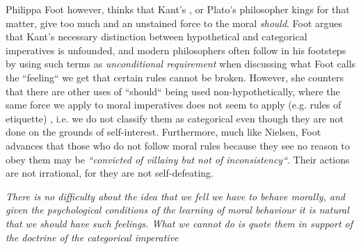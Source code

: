 \documentclass[english,course]{Notes}
\newcommand{\ita}[1]{\textit{#1}}
\newcommand\quo[1]{\begin{displayquote}\ita{\large{#1}}\end{displayquote}}
\begin{document}
\par{Philippa Foot however, thinks that Kant's , or Plato's philosopher kings for that matter, give too much and an unstained force to the moral \ita{should}. Foot argues that Kant's necessary distinction between hypothetical and categorical imperatives is unfounded, and modern philosophers often follow in his footsteps by using such terms as \ita{unconditional requirement} when discussing what Foot calls the ``feeling`` we get that certain rules cannot be broken. However, she counters that there are other uses of ``should`` being used non-hypothetically, where the same force we apply to moral imperatives does not seem to apply (e.g. rules of etiquette) , i.e. we do not classify them as categorical even though they are not done on the grounds of self-interest. Furthermore, much like Nielsen, Foot advances that those who do not follow moral rules because they see no reason to obey them may be \ita{``convicted of villainy but not of inconsistency``}. Their actions are not irrational, for they are not self-defeating.}

\quo{There is no difficulty about the idea that we fell we have to behave morally, and given the psychological conditions of the learning of moral behaviour it is natural that we should have such feelings. What we cannot do is quote them in support of the doctrine of the categorical imperative}
\end{document}
